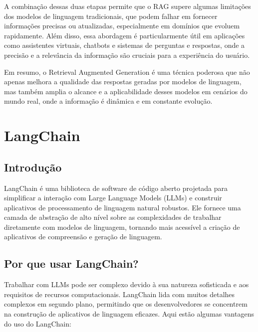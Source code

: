 \documentclass[14pt,a4paper,oneside]{book}
\begin{document}
A combinação dessas duas etapas permite que o RAG supere algumas limitações dos modelos de linguagem tradicionais, que podem falhar em fornecer informações precisas ou atualizadas, especialmente em domínios que evoluem rapidamente. Além disso, essa abordagem é particularmente útil em aplicações como assistentes virtuais, chatbots e sistemas de perguntas e respostas, onde a precisão e a relevância da informação são cruciais para a experiência do usuário.

Em resumo, o Retrieval Augmented Generation é uma técnica poderosa que não apenas melhora a qualidade das respostas geradas por modelos de linguagem, mas também amplia o alcance e a aplicabilidade desses modelos em cenários do mundo real, onde a informação é dinâmica e em constante evolução.




\chapter{LangChain}

\section{Introdução}

LangChain é uma biblioteca de software de código aberto projetada para simplificar a interação com Large Language Models (LLMs) e construir aplicativos de processamento de linguagem natural robustos. Ele fornece uma camada de abstração de alto nível sobre as complexidades de trabalhar diretamente com modelos de linguagem, tornando mais acessível a criação de aplicativos de compreensão e geração de linguagem.

\section{Por que usar LangChain?}

Trabalhar com LLMs pode ser complexo devido à sua natureza sofisticada e aos requisitos de recursos computacionais. LangChain lida com muitos detalhes complexos em segundo plano, permitindo que os desenvolvedores se concentrem na construção de aplicativos de linguagem eficazes. Aqui estão algumas vantagens do uso do LangChain:
\end{document}
